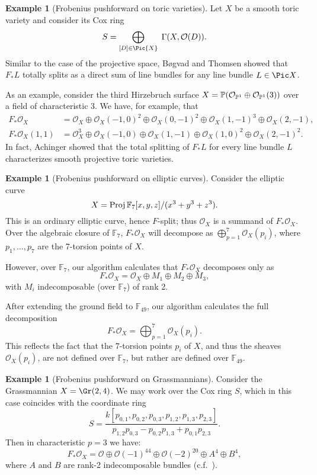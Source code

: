 \documentclass[12pt]{article}
\def\OO{\mathcal O}
\def\FF{\mathbb F}
\theoremstyle{theorem}
\numberwithin{thm}{section}
\theoremstyle{definition}
\newtheorem{exa}[thm]{Example}
\begin{document}
\begin{exa}[Frobenius pushforward on toric varieties]
  Let $X$ be a smooth toric variety and consider its Cox ring
  \[ S = \bigoplus_{[D]\in\Pic{X}} \; \Gamma(X, \OO(D)). \]
  Similar to the case of the projective space, B{\o}gvad and Thomsen \cite{Bogvad98,Thomsen00} showed that $F_*L$ totally splits as a direct sum of line bundles for any line bundle $L\in\Pic X$.

  As an example, consider the third Hirzebruch surface $X=\P(\OO_{\P^1}\oplus \OO_{\P^1}(3))$ over a field of characteristic 3. We have, for example, that
  \begin{align*}
    F_*\OO_X      &= \OO_X   \oplus \OO_X(-1,0)^2 \oplus \OO_X(0,-1)^2 \oplus \OO_X(1,-1)^3 \oplus \OO_X(2,-1), \\
    F_*\OO_X(1,1) &= \OO_X^3 \oplus \OO_X(-1,0)   \oplus \OO_X(1,-1)   \oplus \OO_X(1, 0)^2 \oplus \OO_X(2,-1)^2.
  \end{align*}
  In fact, Achinger \cite{Achinger15} showed that the total splitting of $F_*L$ for every line bundle $L$ characterizes smooth projective toric varieties.
\end{exa}

\begin{exa}[Frobenius pushforward on elliptic curves]\label{ex:elliptic}
  Consider the elliptic curve
  \[ X = \Proj \FF_7[x,y,z]/(x^3+y^3+z^3). \]
  This is an ordinary elliptic curve, hence $F$-split; thus $\OO_X$ is a summand of $F_* \OO_X$. Over the algebraic closure of $\FF_7$, $F_*\OO_X$ will decompose as $\bigoplus_{p=1}^7 \OO_X(p_i)$, where $p_1,\dots,p_7$ are the 7-torsion points of $X$.

  However, over $\FF_7$, our algorithm calculates that $F_*\OO_X$ decomposes only as
  $$ F_* \OO_X =\OO_X \oplus M_1\oplus M_2\oplus M_3, $$
  with $M_i$ indecomposable (over $\FF_7$) of rank 2.

  After extending the ground field to $\FF_{49}$, our algorithm calculates the full decomposition
  $$ F_* \OO_X=\bigoplus_{p=1}^7 \OO_X(p_i). $$
  This reflects the fact that the 7-torsion points $p_i$ of $X$, and thus the sheaves $\OO_X(p_i)$, are not defined over $\FF_7$, but rather are defined over $\FF_{49}$.
\end{exa}

\begin{exa}[Frobenius pushforward on Grassmannians]
  Consider the Grassmannian $X = \Gr(2,4)$. We may work over the Cox ring $S$,
  which in this case coincides with the coordinate ring
  \[ S = \frac{k[p_{0,1},p_{0,2},p_{0,3},p_{1,2},p_{1,3},p_{2,3}]}{p_{1,2}p_{0,3}-p_{0,2}p_{1,3}+p_{0,1}p_{2,3}}. \]
  Then in characteristic $p=3$ we have:
  \[ F_*\OO_X = \OO \oplus \OO(-1)^{44} \oplus \OO(-2)^{20} \oplus A^4 \oplus B^4, \]
  where $A$ and $B$ are rank-2 indecomposable bundles (c.f.~\cite{RSVdB22}).
\end{exa}
\end{document}
